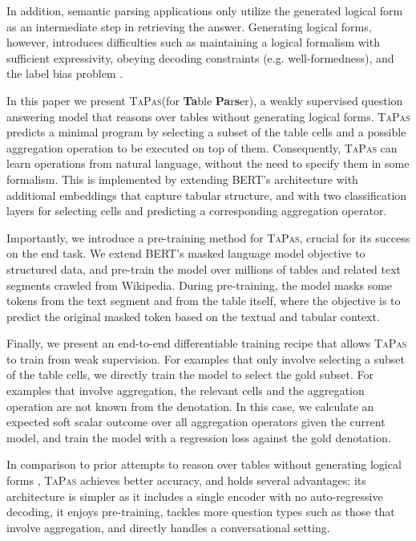 \documentclass[11pt,a4paper]{article}
\newcommand{\ours}{\textsc{TaPas}\xspace}
\begin{document}
In addition, semantic parsing applications only utilize the generated logical form as an intermediate step in retrieving the answer. Generating logical forms, however, introduces difficulties such as maintaining a logical formalism with sufficient expressivity, obeying decoding constraints (e.g. well-formedness), and the label bias problem \cite{andor2016globally,lafferty01crf}.

In this paper we present \ours (for \textbf{Ta}ble \textbf{Pa}r\textbf{s}er), a weakly supervised question answering model that reasons over tables without generating logical forms. \ours predicts a minimal program by selecting a subset of the table cells and a possible aggregation operation to be executed on top of them. Consequently, \ours can learn operations from natural language, without the need to specify them in some formalism.
This is implemented by extending BERT's architecture \cite{devlin2018BERT} with additional embeddings that capture tabular structure, and with two classification layers for selecting cells and predicting a corresponding aggregation operator.

Importantly, we introduce a pre-training method for \ours, crucial for its success on the end task. We extend BERT's masked language model objective to structured data, and pre-train the model over millions of tables and related text segments crawled from Wikipedia. During pre-training, the model masks some tokens from the text segment and from the table itself, where the objective is to predict the original masked token based on the textual and tabular context.

Finally, we present an end-to-end differentiable training recipe that allows \ours to train from weak supervision. For examples that only involve selecting a subset of the table cells, we directly train the model to select the gold subset. For examples that involve aggregation, the relevant cells and the aggregation operation are not known from the denotation. In this case, we calculate an expected soft scalar outcome over all aggregation operators given the current model, and train the model with a regression loss against the gold denotation.   

In comparison to prior attempts to reason over tables without generating logical forms \cite{neelakantan2016neural, yin-etal-2016-neural, muller2019answering}, \ours achieves better accuracy, and holds several advantages: its architecture is simpler as it includes a single encoder with no auto-regressive decoding, it enjoys pre-training, tackles more question types such as those that involve aggregation, and directly handles a conversational setting.
\end{document}
